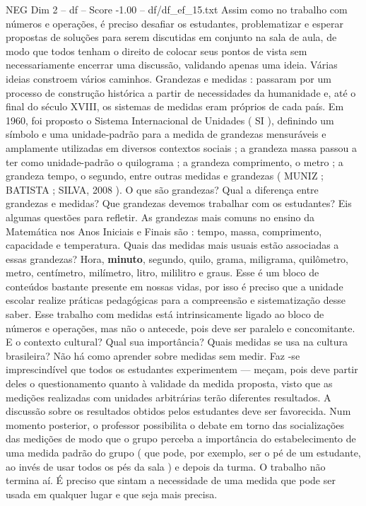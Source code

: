 \begin{textsample}{NEG Dim 2 – df – Score -1.00 – df/df\_ef\_15.txt}
Assim como no trabalho com números e operações, é preciso desafiar os estudantes, problematizar e esperar propostas de soluções para serem discutidas em conjunto na sala de aula, de modo que todos tenham o direito de colocar seus pontos de vista sem necessariamente encerrar uma discussão, validando apenas uma ideia.
Várias ideias constroem vários caminhos.
Grandezas e medidas : passaram por um processo de construção histórica a partir de necessidades da humanidade e, até o final do século XVIII, os sistemas de medidas eram próprios de cada país.
Em 1960, foi proposto o Sistema Internacional de Unidades ( SI ), definindo um símbolo e uma unidade-padrão para a medida de grandezas mensuráveis e amplamente utilizadas em diversos contextos sociais ; a grandeza massa passou a ter como unidade-padrão o quilograma ; a grandeza comprimento, o metro ; a grandeza tempo, o segundo, entre outras medidas e grandezas ( MUNIZ ; BATISTA ; SILVA, 2008 ).
O que são grandezas?
Qual a diferença entre grandezas e medidas?
Que grandezas devemos trabalhar com os estudantes?
Eis algumas questões para refletir.
As grandezas mais comuns no ensino da Matemática nos Anos Iniciais e Finais são : tempo, massa, comprimento, capacidade e temperatura.
Quais das medidas mais usuais estão associadas a essas grandezas?
Hora, \textbf{minuto}, segundo, quilo, grama, miligrama, quilômetro, metro, centímetro, milímetro, litro, mililitro e graus.
Esse é um bloco de conteúdos bastante presente em nossas vidas, por isso é preciso que a unidade escolar realize práticas pedagógicas para a compreensão e sistematização desse saber.
Esse trabalho com medidas está intrinsicamente ligado ao bloco de números e operações, mas não o antecede, pois deve ser paralelo e concomitante.
E o contexto cultural?
Qual sua importância?
Quais medidas se usa na cultura brasileira?
Não há como aprender sobre medidas sem medir.
Faz -se imprescindível que todos os estudantes experimentem — meçam, pois deve partir deles o questionamento quanto à validade da medida proposta, visto que as medições realizadas com unidades arbitrárias terão diferentes resultados.
A discussão sobre os resultados obtidos pelos estudantes deve ser favorecida.
Num momento posterior, o professor possibilita o debate em torno das socializações das medições de modo que o grupo perceba a importância do estabelecimento de uma medida padrão do grupo ( que pode, por exemplo, ser o pé de um estudante, ao invés de usar todos os pés da sala ) e depois da turma.
O trabalho não termina aí.
É preciso que sintam a necessidade de uma medida que pode ser usada em qualquer lugar e que seja mais precisa.

\end{textsample}

